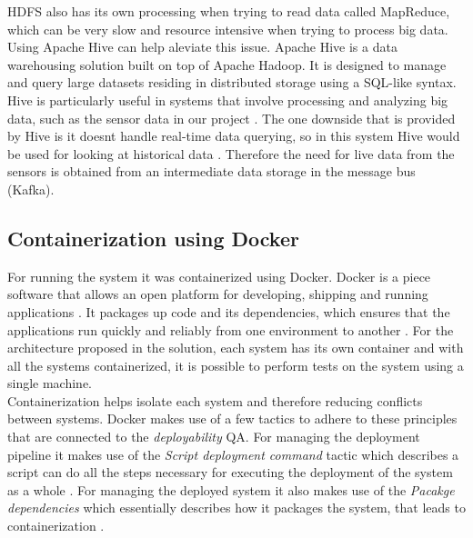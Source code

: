 HDFS also has its own processing when trying to read data called MapReduce, which can be very slow and resource intensive when trying to process big data. Using Apache Hive can help aleviate this issue. Apache Hive is a data warehousing solution built on top of Apache Hadoop. It is designed to manage and query large datasets residing in distributed storage using a SQL-like syntax. Hive is particularly useful in systems that involve processing and analyzing big data, such as the sensor data in our project \cite{ApacheHive}.
The one downside that is provided by Hive is it doesnt handle real-time data querying, so in this system Hive would be used for looking at historical data \cite{ApacheHive}. Therefore the need for live data from the sensors is obtained from an intermediate data storage in the message bus (Kafka).

\subsection{\textbf{Containerization using Docker}}
For running the system it was containerized using Docker. Docker is a piece software that allows an open platform for developing, shipping and running applications \cite{Docker2022What}. It packages up code and its dependencies, which ensures that the applications run quickly and reliably from one environment to another \cite{Docker2022What}.
For the architecture proposed in the solution, each system has its own container and with all the systems containerized, it is possible to perform tests on the system using a single machine.\vspace{2mm} \\ Containerization helps isolate each system and therefore reducing conflicts between systems. Docker makes use of a few tactics to adhere to these principles that are connected to the \textit{deployability} QA. For managing the deployment pipeline it makes use of the \textit{Script deployment command} tactic which describes a script can do all the steps necessary for executing the deployment of the system as a whole \cite{Bass2012Software}. For managing the deployed system it also makes use of the \textit{Pacakge dependencies} which essentially describes how it packages the system, that leads to containerization \cite{Bass2012Software}.


